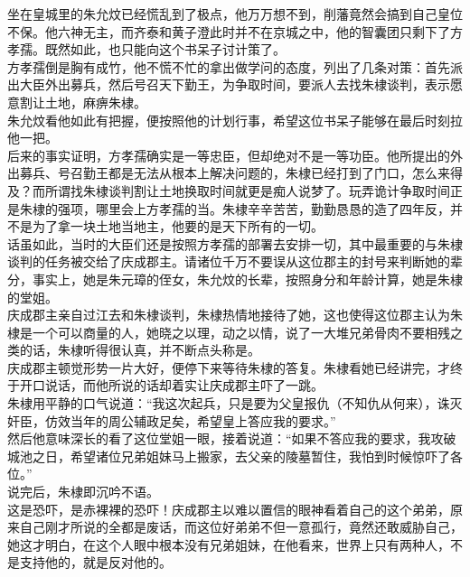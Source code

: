 \begin{multicols}{\theparacolNo}
坐在皇城里的朱允炆已经慌乱到了极点，他万万想不到，削藩竟然会搞到自己皇位不保。他六神无主，而齐泰和黄子澄此时并不在京城之中，他的智囊团只剩下了方孝孺。既然如此，也只能向这个书呆子讨计策了。\\

方孝孺倒是胸有成竹，他不慌不忙的拿出做学问的态度，列出了几条对策：首先派出大臣外出募兵，然后号召天下勤王，为争取时间，要派人去找朱棣谈判，表示愿意割让土地，麻痹朱棣。\\

朱允炆看他如此有把握，便按照他的计划行事，希望这位书呆子能够在最后时刻拉他一把。\\

后来的事实证明，方孝孺确实是一等忠臣，但却绝对不是一等功臣。他所提出的外出募兵、号召勤王都是无法从根本上解决问题的，朱棣已经打到了门口，怎么来得及？而所谓找朱棣谈判割让土地换取时间就更是痴人说梦了。玩弄诡计争取时间正是朱棣的强项，哪里会上方孝孺的当。朱棣辛辛苦苦，勤勤恳恳的造了四年反，并不是为了拿一块土地当地主，他要的是天下所有的一切。\\

话虽如此，当时的大臣们还是按照方孝孺的部署去安排一切，其中最重要的与朱棣谈判的任务被交给了庆成郡主。请诸位千万不要误从这位郡主的封号来判断她的辈分，事实上，她是朱元璋的侄女，朱允炆的长辈，按照身分和年龄计算，她是朱棣的堂姐。\\

庆成郡主亲自过江去和朱棣谈判，朱棣热情地接待了她，这也使得这位郡主认为朱棣是一个可以商量的人，她晓之以理，动之以情，说了一大堆兄弟骨肉不要相残之类的话，朱棣听得很认真，并不断点头称是。\\

庆成郡主顿觉形势一片大好，便停下来等待朱棣的答复。朱棣看她已经讲完，才终于开口说话，而他所说的话却着实让庆成郡主吓了一跳。\\

朱棣用平静的口气说道：“我这次起兵，只是要为父皇报仇（不知仇从何来），诛灭奸臣，仿效当年的周公辅政足矣，希望皇上答应我的要求。”\\

然后他意味深长的看了这位堂姐一眼，接着说道：“如果不答应我的要求，我攻破城池之日，希望诸位兄弟姐妹马上搬家，去父亲的陵墓暂住，我怕到时候惊吓了各位。”\\

说完后，朱棣即沉吟不语。\\

这是恐吓，是赤裸裸的恐吓！庆成郡主以难以置信的眼神看着自己的这个弟弟，原来自己刚才所说的全都是废话，而这位好弟弟不但一意孤行，竟然还敢威胁自己，她这才明白，在这个人眼中根本没有兄弟姐妹，在他看来，世界上只有两种人，不是支持他的，就是反对他的。\\


\end{multicols}
